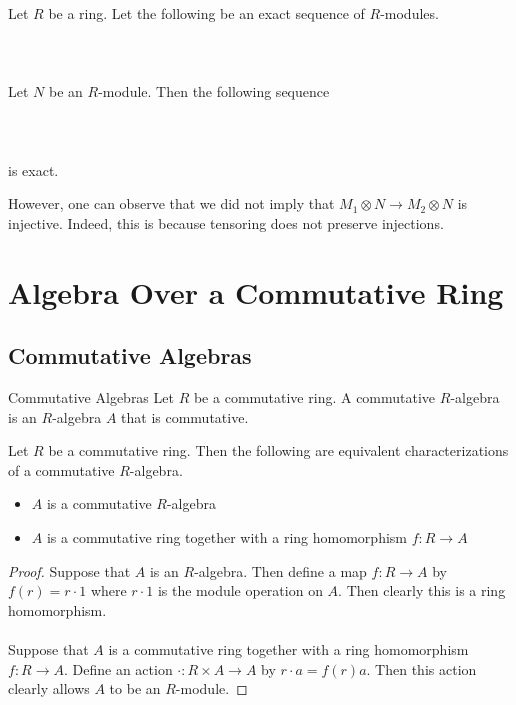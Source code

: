 \documentclass[a4paper]{article}
\begin{document}
\begin{prp}{}{} Let $R$ be a ring. Let the following be an exact sequence of $R$-modules. \\~\\
\\~\\ Let $N$ be an $R$-module. Then the following sequence \\~\\
 \\~\\
is exact. 
\end{prp}

However, one can observe that we did not imply that $M_1\otimes N\to M_2\otimes N$ is                                                             injective. Indeed, this is because tensoring does not preserve injections. 

\pagebreak
\section{Algebra Over a Commutative Ring}
\subsection{Commutative Algebras}
\begin{defn}{Commutative Algebras}{} Let $R$ be a commutative ring. A commutative $R$-algebra is an $R$-algebra $A$ that is commutative. 
\end{defn}

\begin{prp}{}{} Let $R$ be a commutative ring. Then the following are equivalent characterizations of a commutative $R$-algebra. 
\begin{itemize}
\item $A$ is a commutative $R$-algebra
\item $A$ is a commutative ring together with a ring homomorphism $f:R\to A$
\end{itemize}\tcbline
\begin{proof}
Suppose that $A$ is an $R$-algebra. Then define a map $f:R\to A$ by $f(r)=r\cdot 1$ where $r\cdot 1$ is the module operation on $A$. Then clearly this is a ring homomorphism. \\~\\
Suppose that $A$ is a commutative ring together with a ring homomorphism $f:R\to A$. Define an action $\cdot:R\times A\to A$ by $r\cdot a=f(r)a$. Then this action clearly allows $A$ to be an $R$-module. 
\end{proof}
\end{prp}
\end{document}

